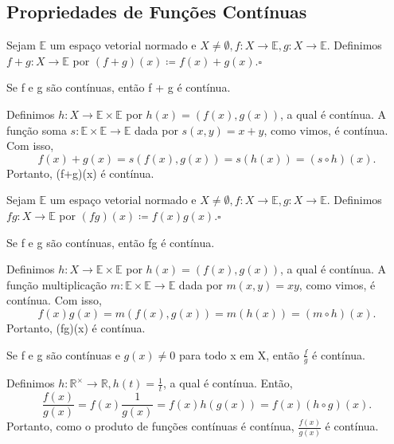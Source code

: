 \documentclass[MetricSpaces/metric_notes.tex]{subfiles}
\begin{document}
\subsection{Propriedades de Funções Contínuas}
\begin{def*}
	Sejam \(\mathbb{E}\) um espaço vetorial normado e \(X \neq\emptyset, f:X\rightarrow \mathbb{E}, g:X\rightarrow \mathbb{E}.\)
	Definimos \(f+g:X\rightarrow \mathbb{E}\) por \((f+g)(x)\coloneqq f(x)+g(x).\square\)
\end{def*}
\begin{prop*}
	Se f e g são contínuas, então f + g é contínua.
\end{prop*}
\begin{proof*}
	Definimos \(h:X\rightarrow \mathbb{E}\times \mathbb{E}\) por \(h(x) = (f(x), g(x))\), a qual é contínua. A função soma
	\(s:\mathbb{E}\times \mathbb{E}\rightarrow \mathbb{E}\) dada por \(s(x, y) = x + y\), como vimos, é contínua. Com isso,
	\[
		f(x)+g(x)=s(f(x), g(x)) = s(h(x)) = (s\circ{h})(x).
	\]
	Portanto, (f+g)(x) é contínua.\qedsymbol
\end{proof*}
\begin{def*}
	Sejam \(\mathbb{E}\) um espaço vetorial normado e \(X \neq\emptyset, f:X\rightarrow \mathbb{E}, g:X\rightarrow \mathbb{E}.\)
	Definimos \(fg:X\rightarrow \mathbb{E}\) por \((fg)(x)\coloneqq f(x)g(x).\square\)
\end{def*}
\begin{prop*}
	Se f e g são contínuas, então fg é contínua.
\end{prop*}
\begin{proof*}
	Definimos \(h:X\rightarrow \mathbb{E}\times \mathbb{E}\) por \(h(x) = (f(x), g(x))\), a qual é contínua. A função multiplicação
	\(m:\mathbb{E}\times \mathbb{E}\rightarrow \mathbb{E}\) dada por \(m(x, y) = xy\), como vimos, é contínua. Com isso,
	\[
		f(x)g(x)=m(f(x), g(x)) = m(h(x)) = (m\circ{h})(x).
	\]
	Portanto, (fg)(x) é contínua.\qedsymbol
\end{proof*}
\begin{prop*}
	Se f e g são contínuas e \(g(x)\neq0\) para todo x em X, então \(\frac{f}{g}\) é contínua.
\end{prop*}
\begin{proof*}
	Definimos \(h:\mathbb{R}^{\times}\rightarrow \mathbb{R}, h(t)=\frac{1}{t}\), a qual é contínua. Então,
	\[
		\frac{f(x)}{g(x)} = f(x)\frac{1}{g(x)} = f(x)h(g(x)) = f(x)(h\circ{g})(x).
	\]
	Portanto, como o produto de funções contínuas é contínua, \(\frac{f(x)}{g(x)}\) é contínua. \qedsymbol
\end{proof*}
\end{document}
